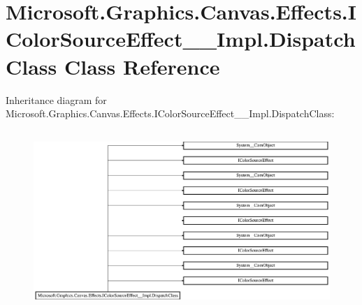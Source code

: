 \hypertarget{class_microsoft_1_1_graphics_1_1_canvas_1_1_effects_1_1_i_color_source_effect_____impl_1_1_dispatch_class}{}\section{Microsoft.\+Graphics.\+Canvas.\+Effects.\+I\+Color\+Source\+Effect\+\_\+\+\_\+\+Impl.\+Dispatch\+Class Class Reference}
\label{class_microsoft_1_1_graphics_1_1_canvas_1_1_effects_1_1_i_color_source_effect_____impl_1_1_dispatch_class}
Inheritance diagram for Microsoft.\+Graphics.\+Canvas.\+Effects.\+I\+Color\+Source\+Effect\+\_\+\+\_\+\+Impl.\+Dispatch\+Class\+:\begin{figure}[H]
\begin{center}
\leavevmode
\includegraphics[height=6.844445cm]{class_microsoft_1_1_graphics_1_1_canvas_1_1_effects_1_1_i_color_source_effect_____impl_1_1_dispatch_class}
\end{center}
\end{figure}
